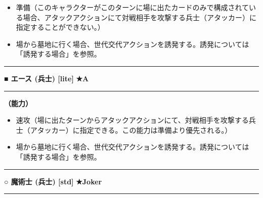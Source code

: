 \documentclass[twocolumn,a5paper,papersize,10pt]{jarticle}
\begin{document}
\vspace{-1zh}%
\begin{itemize}
\setlength{\leftskip}{-0.3cm}
\setlength{\parskip}{0pt} %

\item 準備（このキャラクターがこのターンに場に出たカードのみで構成されている場合、アタックアクションにて対戦相手を攻撃する兵士（アタッカー）に指定することができない。）

\item 場から墓地に行く場合、世代交代アクションを誘発する。誘発については「誘発する場合」を参照。
\vspace{-1zh}%
\end{itemize}
\vspace{2mm} %
\hrule height 0.5mm depth 0mm width 66.5mm %
\vspace{1mm} %
{\small\bf ■ エース {\scriptsize (兵士) [lite]}} %
\hfill 
{\footnotesize\bf ★A }

\vspace{1mm}%
\hrule height 0.1mm depth 0mm width 66.5mm %
\vspace{1mm}%

{\bf（能力）}


\vspace{-1zh}%
\begin{itemize}
\setlength{\leftskip}{-0.3cm}
\setlength{\parskip}{0pt} %

\item 速攻（場に出たターンからアタックアクションにて、対戦相手を攻撃する兵士（アタッカー）に指定できる。この能力は準備より優先される。）

\item 場から墓地に行く場合、世代交代アクションを誘発する。誘発については「誘発する場合」を参照。
\vspace{-1zh}%
\end{itemize}
\vspace{2mm} %
\hrule height 0.5mm depth 0mm width 66.5mm %
\vspace{1mm} %
{\small\bf ○ 魔術士 {\scriptsize (兵士) [std]}} %
\hfill 
{\footnotesize\bf ★Joker }

\vspace{1mm}%
\hrule height 0.1mm depth 0mm width 66.5mm %
\vspace{1mm}%
\end{document}
